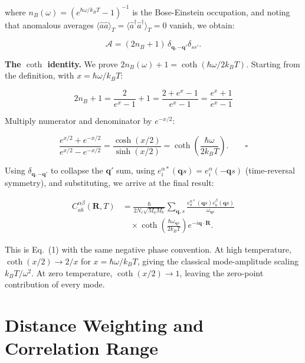\documentclass[aps,prb,reprint,amsmath,amssymb,floatfix]{revtex4-2}
\begin{document}
where \(n_B(\omega) = (e^{\hbar\omega/k_BT}-1)^{-1}\) is the
Bose-Einstein occupation, and noting that anomalous averages
\(\langle\hat{a}\hat{a}\rangle_T = \langle\hat{a}^\dagger\hat{a}^\dagger\rangle_T = 0\)
vanish, we obtain:

\begin{equation*}
\mathcal A=(2n_B+1)\,
\delta_{\mathbf q,-\mathbf q'}\delta_{ss'} .
\end{equation*}

\textbf{The \(\coth\) identity.} We prove
\(2n_B(\omega)+1 = \coth(\hbar\omega/2k_BT)\). Starting from the
definition, with \(x = \hbar\omega/k_BT\):

\begin{equation*}
2n_B+1 = \frac{2}{e^x-1}+1 = \frac{2+e^x-1}{e^x-1} = \frac{e^x+1}{e^x-1}
\end{equation*}

Multiply numerator and denominator by \(e^{-x/2}\):

\begin{equation*}
\frac{e^{x/2}+e^{-x/2}}{e^{x/2}-e^{-x/2}}
=\frac{\cosh(x/2)}{\sinh(x/2)}
=\coth\!\left(\frac{\hbar\omega}{2k_BT}\right). \qquad \square
\end{equation*}

Using \(\delta_{\mathbf{q},-\mathbf{q}'}\) to collapse the
\(\mathbf{q}'\) sum, using
\(e_i^{\alpha*}(\mathbf{q}s) = e_i^\alpha(-\mathbf{q}s)\) (time-reversal
symmetry), and substituting, we arrive at the final result:

{\footnotesize
\begin{equation*}
\boxed{\begin{aligned}
C_{ab}^{\alpha\beta}(\mathbf R,T)
 &=\frac{\hbar}{2N_c\sqrt{M_aM_b}}\sum_{\mathbf q,s}
 \frac{e_a^{\alpha*}(\mathbf q s)e_b^\beta(\mathbf q s)}
 {\omega_{\mathbf q s}}\\
 &\quad\times
 \coth\!\left(\frac{\hbar\omega_{\mathbf q s}}{2k_BT}\right)
 e^{-i\mathbf q\cdot\mathbf R}.
\end{aligned}}
\end{equation*}
}

This is Eq.~(1) with the same negative phase convention. At high temperature,
\(\coth(x/2)\to2/x\) for \(x=\hbar\omega/k_BT\), giving the classical
mode-amplitude scaling \(k_BT/\omega^2\). At zero temperature,
\(\coth(x/2)\to1\), leaving the zero-point contribution of every mode.

\section{Distance Weighting and Correlation Range}
\label{appendix-b-thermal-coherence-length}
\end{document}
